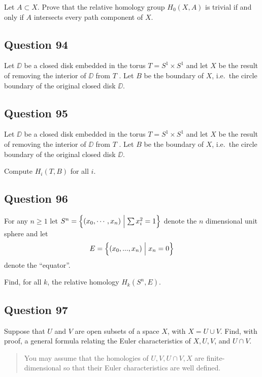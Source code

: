 \documentclass[12pt]{article}
\begin{document}
Let \(A \subset X\). Prove that the relative homology group
\(H_0 (X, A)\) is trivial if and only if \(A\) intersects every path
component of \(X\).

\hypertarget{question-94-2}{%
\subsection{Question 94}\label{question-94-2}}

Let \(\DD\) be a closed disk embedded in the torus
\(T = S^1 \times S^1\) and let \(X\) be the result of removing the
interior of \(\DD\) from \(T\) . Let \(B\) be the boundary of \(X\),
i.e.~the circle boundary of the original closed disk \(\DD\).

\hypertarget{question-95-2}{%
\subsection{Question 95}\label{question-95-2}}

Let \(\DD\) be a closed disk embedded in the torus
\(T = S^1 \times S^1\) and let \(X\) be the result of removing the
interior of \(\DD\) from \(T\) . Let \(B\) be the boundary of \(X\),
i.e.~the circle boundary of the original closed disk \(\DD\).

Compute \(H_i (T, B)\) for all \(i\).

\hypertarget{question-96-2}{%
\subsection{Question 96}\label{question-96-2}}

For any \(n \geq 1\) let
\(S^n = \left\{{(x_0 , \cdots , x_n )\mathrel{\Big|} \sum x_i^2 =1}\right\}\) denote the
\(n\) dimensional unit sphere and let
\[E = \left\{{(x_0 , . . . , x_n )\mathrel{\Big|} x_n = 0}\right\}\] denote the
``equator''.

Find, for all \(k\), the relative homology \(H_k (S^n , E)\).

\hypertarget{question-97-2}{%
\subsection{Question 97}\label{question-97-2}}

Suppose that \(U\) and \(V\) are open subsets of a space \(X\), with
\(X = U \cup V\). Find, with proof, a general formula relating the Euler
characteristics of \(X, U, V\), and \(U \cap V\).

\begin{quote}
You may assume that the homologies of \(U, V, U \cap V, X\) are
finite-dimensional so that their Euler characteristics are well defined.
\end{quote}
\end{document}
